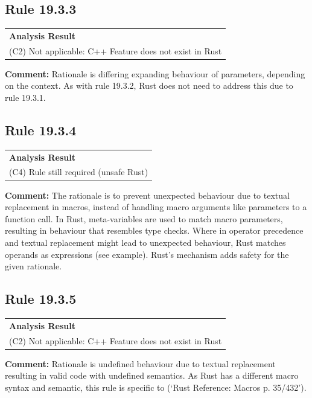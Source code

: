 \subsection*{Rule 19.3.3}
\begin{longtable}{p{13cm}}
\textbf{Analysis Result} \\
(C2) Not applicable: C++ Feature does not exist in Rust \\
\end{longtable}
\textbf{Comment:} Rationale is differing expanding behaviour of parameters, depending on the context. As with rule 19.3.2, Rust does not need to address this due to rule 19.3.1. \\
\subsection*{Rule 19.3.4}
\begin{longtable}{p{13cm}}
\textbf{Analysis Result} \\
(C4) Rule still required (unsafe Rust) \\
\end{longtable}
\textbf{Comment:} The rationale is to prevent unexpected behaviour due to textual replacement in \Cpp macros, instead of handling macro arguments like parameters to a function call. In Rust, meta-variables are used to match macro parameters, resulting in behaviour that resembles type checks. Where in \Cpp operator precedence and textual replacement might lead to unexpected behaviour, Rust matches operands as expressions (see example). Rust's mechanism adds safety for the given rationale. \\


\subsection*{Rule 19.3.5}
\begin{longtable}{p{13cm}}
\textbf{Analysis Result} \\
(C2) Not applicable: C++ Feature does not exist in Rust \\
\end{longtable}
\textbf{Comment:} Rationale is undefined behaviour due to textual replacement resulting in valid code with undefined semantics. As Rust has a different macro syntax and semantic, this rule is specific to \Cpp (`Rust Reference: Macros p. 35/432'). \\
